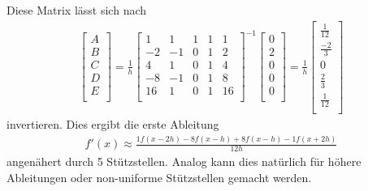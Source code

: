 Diese Matrix lässt sich nach
\begin{align}
\begin{bmatrix}
A \\
B \\
C \\
D \\
E \\
\end{bmatrix}
=
\frac{1}{h}
\begin{bmatrix}
1 & 1 & 1 & 1 & 1 \\
-2 & -1 & 0 & 1 & 2 \\
4 & 1 & 0 & 1 & 4 \\
-8 & -1 & 0 & 1 & 8 \\
16 & 1 & 0 & 1 & 16 \\
\end{bmatrix}^{-1}
\begin{bmatrix}
0 \\
2 \\
0 \\
0 \\
0 \\
\end{bmatrix}
=
\frac{1}{h}
\begin{bmatrix}
\frac{1}{12} \\
\frac{-2}{3} \\
0 \\
\frac{2}{3} \\
\frac{1}{12} \\
\end{bmatrix}
\end{align}
invertieren.
Dies ergibt die erste Ableitung
\begin{align}
f'(x)  \approx \frac{1f(x-2h) - 8f(x-h) + 8f(x-h) - 1f(x+2h)}{12h}
\label{ableitung:eqn:aprox_5}
\end{align}
angenähert durch 5 Stützstellen.
Analog kann dies natürlich für höhere Ableitungen oder non-uniforme Stützstellen gemacht werden.
